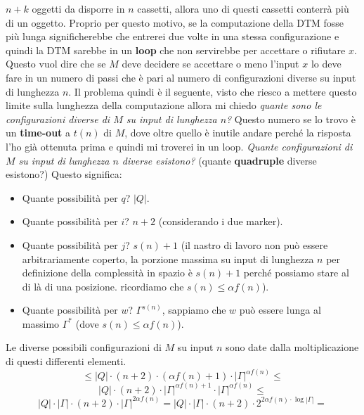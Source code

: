 \documentclass{article}
\begin{document}
$n+k$ oggetti da disporre in $n$ cassetti, allora uno di questi cassetti conterrà più di un oggetto.
\newline\newline
Proprio per questo motivo, se la computazione della DTM fosse più lunga significherebbe che
entrerei due volte in una stessa configurazione e quindi la DTM sarebbe in un \textbf{loop} che non
servirebbe per accettare o rifiutare $x$.
\newline\newline
Questo
vuol dire che se $M$ deve decidere se accettare o meno l'input $x$ lo deve fare in un numero di passi
che è pari al numero di configurazioni diverse su input di lunghezza $n$.
\newline\newline
Il problema quindi è il seguente, visto che riesco a mettere questo limite sulla lunghezza della computazione
allora mi chiedo \textit{quante sono le configurazioni diverse di $M$ su input di lunghezza $n$?}
Questo numero se lo trovo è un \textbf{time-out} a $t(n)$ di $M$, dove oltre quello è inutile andare
perché la risposta l'ho già ottenuta prima e quindi mi troverei in un loop.
\newline\newline
\textit{Quante configurazioni di $M$ su input di lunghezza $n$ diverse esistono?} (quante
\textbf{quadruple} diverse esistono?) Questo significa:
\begin{itemize}
    \item Quante possibilità per $q$? $|Q|$.
    \item Quante possibilità per $i$? $n+2$ (considerando i due marker).
    \item Quante possibilità per $j$? $s(n)+1$ (il nastro di lavoro non può
          essere arbitrariamente coperto, la porzione massima su input di lunghezza $n$
          per definizione della complessità in spazio è $s(n)+1$ perché possiamo stare
          al di là di una posizione. ricordiamo che $s(n)\leq\alpha f(n)$).
    \item Quante possibilità per $w$? $\Gamma^{s(n)}$, sappiamo che $w$ può essere
          lunga al massimo $\Gamma^*$ (dove $s(n)\leq\alpha f(n)$).
\end{itemize}
Le diverse possibili configurazioni di $M$ su input $n$ sono date dalla moltiplicazione di questi
differenti elementi.
$$\leq |Q|\cdot(n+2)\cdot(\alpha f(n)+1)\cdot|\Gamma|^{\alpha f(n)}\leq$$
$$|Q|\cdot(n+2)\cdot|\Gamma|^{\alpha f(n)+1}\cdot|\Gamma|^{\alpha f(n)}\leq$$
$$|Q|\cdot|\Gamma|\cdot(n+2)\cdot|\Gamma|^{2\alpha f(n)}=|Q|\cdot|\Gamma|\cdot(n+2)\cdot2^{2\alpha f(n)\cdot\log |\Gamma|}=$$
\end{document}
